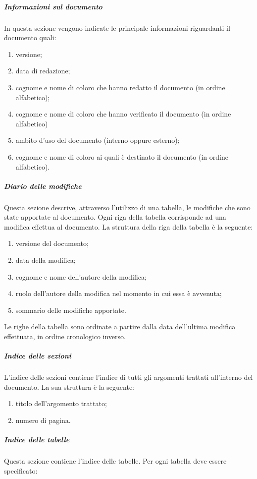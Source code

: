 \documentclass[../NormeProgetto.tex]{subfiles}
\begin{document}
		\subparagraph{Informazioni sul documento}
		In questa sezione vengono indicate le principale informazioni riguardanti il documento quali:
		\begin{enumerate}
			\item versione;
			\item data di redazione;
			\item cognome e nome di coloro che hanno redatto il documento (in ordine alfabetico);
			\item cognome e nome di coloro che hanno verificato il documento (in ordine alfabetico)
			\item ambito d'uso del documento (interno oppure esterno);
			\item cognome e nome di coloro ai quali è destinato il documento (in ordine alfabetico).
		\end{enumerate}

		\subparagraph{Diario delle modifiche}
		Questa sezione descrive, attraverso l'utilizzo di una tabella, le modifiche che sono state apportate al documento. Ogni riga della tabella corrisponde ad una modifica effettua al documento. La struttura della riga della tabella è la seguente:
		\begin{enumerate}
			\item versione del documento;
			\item data della modifica;
			\item cognome e nome dell'autore della modifica;
			\item ruolo dell'autore della modifica nel momento in cui essa è avvenuta;
			\item sommario delle modifiche apportate.
		\end{enumerate}

		Le righe della tabella sono ordinate a partire dalla data dell'ultima modifica effettuata, in ordine cronologico inverso.

		\subparagraph{Indice delle sezioni}
		L'indice delle sezioni contiene l'indice di tutti gli argomenti trattati all'interno del documento. La sua struttura è la seguente:

		\begin{enumerate}
			\item titolo dell'argomento trattato;
			\item numero di pagina.
		\end{enumerate}

		\subparagraph{Indice delle tabelle}
		Questa sezione contiene l'indice delle tabelle. Per ogni tabella deve essere specificato:
\end{document}
